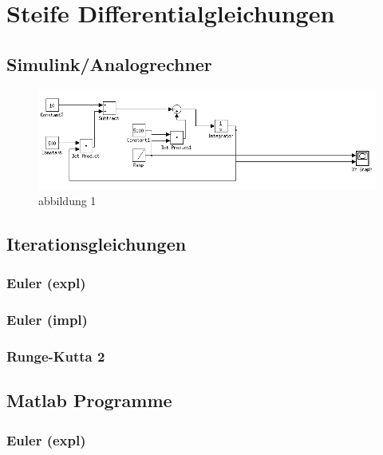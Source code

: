\documentclass[10pt]{scrartcl}
\author{André Harms, Oliver Steenbuck}
\title{\titletext}
\date{02.11.2011}
\begin{document}
\maketitle

\setcounter{tocdepth}{3}
\tableofcontents

\section{Steife Differentialgleichungen}
	\subsection{Simulink/Analogrechner}
	
	\begin{figure}[htbp]
	\centering
		\includegraphics[scale=0.5]{simulink_aufg1_a}
	\caption{abbildung 1}
	\label{fig:abb1}
	\end{figure}

	\subsection{Iterationsgleichungen}
		\subsubsection{Euler (expl)}
		
		\subsubsection{Euler (impl)}
		
		\subsubsection{Runge-Kutta 2}
		
	\subsection{Matlab Programme}
		\subsubsection{Euler (expl)}
			
		
\end{document}
